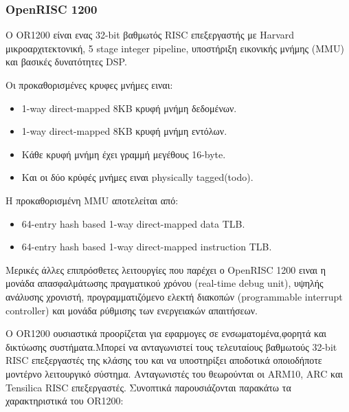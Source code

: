 \documentclass[a4paper,10pt]{article}
\numberwithin{figure}{section}
\numberwithin{table}{section}
\begin{document}
{\subsubsection{OpenRISC 1200}
{ Ο OR1200 είναι ενας 32-bit βαθμωτός RISC επεξεργαστής με Harvard μικροαρχιτεκτονική,
5 stage integer pipeline, υποστήριξη εικονικής μνήμης (MMU) και βασικές δυνατότητες
DSP.

Οι προκαθορισμένες κρυφες μνήμες ειναι:
\begin{itemize}
 \item 1-way direct-mapped 8KB κρυφή μνήμη δεδομένων.
 \item 1-way direct-mapped 8KB κρυφή μνήμη εντόλων.
 \item Κάθε κρυφή μνήμη έχει γραμμή μεγέθους 16-byte.
 \item Και οι δύο κρύφές μνήμες ειναι  physically tagged(todo).
\end{itemize}

Η προκαθορισμένη MMU αποτελείται από:
\begin{itemize}
 \item 64-entry hash based 1-way direct-mapped data TLB.
 \item 64-entry hash based 1-way direct-mapped instruction TLB.
\end{itemize}

Μερικές άλλες επιπρόσθετες λειτουργίες που παρέχει ο OpenRISC 1200 ειναι η μονάδα
απασφαλμάτωσης πραγματικού χρόνου (real-time debug unit), υψηλής ανάλυσης χρονιστή,
προγραμματιζόμενο ελεκτή διακοπών (programmable interrupt controller) και μονάδα
ρύθμισης των ενεργειακών απαιτήσεων.


Ο OR1200 ουσιαστικά προορίζεται για εφαρμογες σε ενσωματομένα,φορητά και δικτύωσης
συστήματα.Μπορεί να ανταγωνιστεί τους τελευταίους βαθμωτούς 32-bit RISC επεξεργαστές
της κλάσης του και να υποστηρίξει αποδοτικά οποιοδήποτε μοντέρνο λειτουργικό σύστημα.
Ανταγωνιστές του θεωρούνται οι ARM10, ARC και Tensilica RISC επεξεργαστές.
\newline
Συνοπτικά παρουσιάζονται παρακάτω τα χαρακτηριστικά του OR1200:

}}
\end{document}
